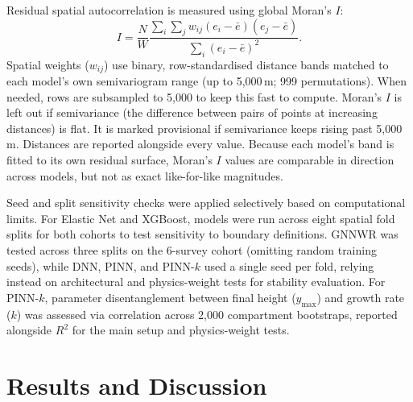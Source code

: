 \documentclass[logo,msc,ai]{infthesis}           %
\begin{document}
Residual spatial autocorrelation is measured using global Moran's $I$:
\begin{equation}
I=\frac{N}{W}\frac{\sum_i\sum_j w_{ij}(e_i-\bar e)(e_j-\bar e)}{\sum_i(e_i-\bar e)^2}.
\label{eq:morans-i}
\end{equation}
Spatial weights ($w_{ij}$) use binary, row-standardised distance bands matched to each model's own semivariogram range (up to 5,000\,m; 999 permutations). When needed, rows are subsampled to 5,000 to keep this fast to compute. Moran's $I$ is left out if semivariance (the difference between pairs of points at increasing distances) is flat. It is marked provisional if semivariance keeps rising past 5,000\,m. Distances are reported alongside every value. Because each model's band is fitted to its own residual surface, Moran's $I$ values are comparable in direction across models, but not as exact like-for-like magnitudes.

Seed and split sensitivity checks were applied selectively based on computational limits. For Elastic Net and XGBoost, models were run across eight spatial fold splits for both cohorts to test sensitivity to boundary definitions. GNNWR was tested across three splits on the 6-survey cohort (omitting random training seeds), while DNN, PINN, and PINN-$k$ used a single seed per fold, relying instead on architectural and physics-weight tests for stability evaluation. For PINN-$k$, parameter disentanglement between final height ($y_{\max}$) and growth rate ($k$) was assessed via correlation across 2,000 compartment bootstraps, reported alongside $R^2$ for the main setup and physics-weight tests.

\chapter{Results and Discussion} \label{ch:results}
\end{document}
